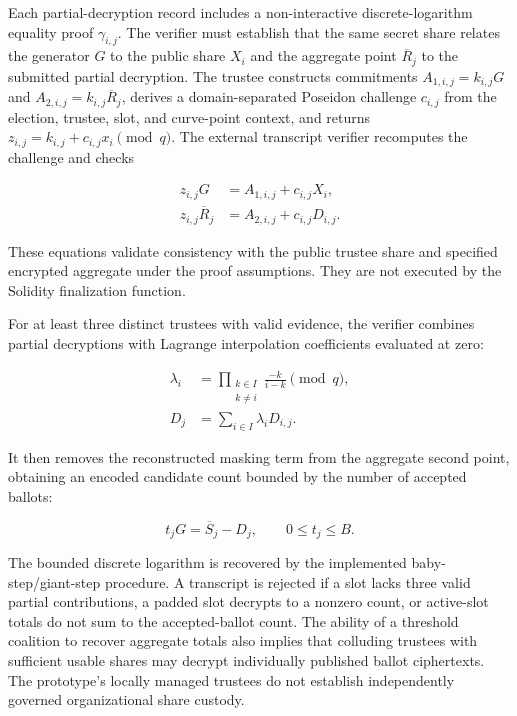 Each partial-decryption record includes a non-interactive
discrete-logarithm equality proof $\gamma_{i,j}$. The verifier must
establish that the same secret share relates the generator $G$ to the
public share $X_i$ and the aggregate point $\overline{R}_j$ to the
submitted partial decryption. The trustee constructs commitments
$A_{1,i,j}=k_{i,j}G$ and
$A_{2,i,j}=k_{i,j}\overline{R}_j$, derives a domain-separated Poseidon
challenge $c_{i,j}$ from the election, trustee, slot, and curve-point
context, and returns
$z_{i,j}=k_{i,j}+c_{i,j}x_i\pmod q$.
The external transcript verifier recomputes the challenge and checks

\begin{equation}
\label{eq:protocol-dleq}
\begin{aligned}
 z_{i,j}G&=A_{1,i,j}+c_{i,j}X_i,\\
 z_{i,j}\overline{R}_j&=A_{2,i,j}+c_{i,j}D_{i,j}.
\end{aligned}
\end{equation}

These equations validate consistency with the public trustee share
and specified encrypted aggregate under the proof assumptions. They
are not executed by the Solidity finalization function.

For at least three distinct trustees with valid evidence, the verifier
combines partial decryptions with Lagrange interpolation coefficients
evaluated at zero:

\begin{equation}
\label{eq:protocol-lagrange}
\begin{aligned}
 \lambda_i&=\prod_{\substack{k\in I\\k\neq i}}
 \frac{-k}{i-k}\pmod q,\\
 D_j&=\sum_{i\in I}\lambda_iD_{i,j}.
\end{aligned}
\end{equation}

It then removes the reconstructed masking term from the aggregate
second point, obtaining an encoded candidate count bounded by the
number of accepted ballots:

\begin{equation}
\label{eq:protocol-tally}
 t_jG=\overline{S}_j-D_j,\qquad 0\leq t_j\leq B.
\end{equation}

The bounded discrete logarithm is recovered by the implemented
baby-step/giant-step procedure. A transcript is rejected if a slot
lacks three valid partial contributions, a padded slot decrypts to a
nonzero count, or active-slot totals do not sum to the accepted-ballot
count. The ability of a threshold coalition to recover aggregate totals
also implies that colluding trustees with sufficient usable shares may
decrypt individually published ballot ciphertexts. The prototype's
locally managed trustees do not establish independently governed
organizational share custody.

